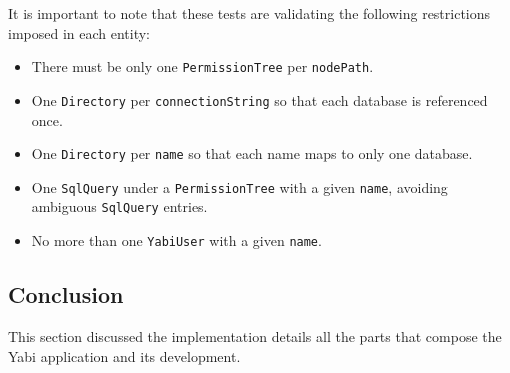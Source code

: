 It is important to note that these tests are validating the following restrictions imposed in each entity:
\begin{itemize}
\item There must be only one \texttt{PermissionTree} per \texttt{nodePath}.
\item One \texttt{Directory} per \texttt{connectionString} so that each database is referenced once.
\item One \texttt{Directory} per \texttt{name} so that each name maps to only one database.
\item One \texttt{SqlQuery} under a \texttt{PermissionTree} with a given \texttt{name}, avoiding ambiguous \texttt{SqlQuery} entries.
\item No more than one \texttt{YabiUser} with a given \texttt{name}.
\end{itemize}

\subsection{Conclusion}
This section discussed the implementation details all the parts that compose the \gls{Yabi} application and its development.



